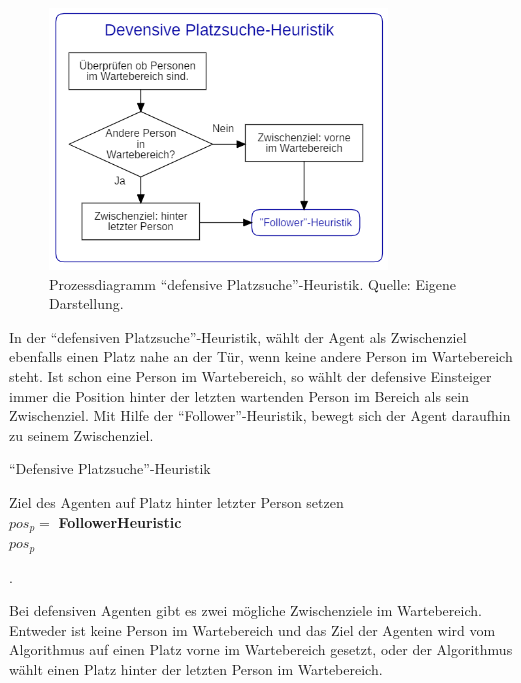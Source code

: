 \begin{figure}[H]
	\centering
		\includegraphics[width=0.8\textwidth]{pictures/model/algorithm/boarding/defensive_boarding/defensive_space_find_heuristic.png}
	\caption{Prozessdiagramm "`defensive Platzsuche"'-Heuristik. Quelle: Eigene Darstellung.}
	\label{fig:DPH}
\end{figure}
In der "`defensiven Platzsuche"'-Heuristik, wählt der Agent als Zwischenziel ebenfalls einen Platz nahe an der Tür, wenn keine andere Person im Wartebereich steht. Ist schon eine Person im Wartebereich, so wählt der defensive Einsteiger immer die Position hinter der letzten wartenden Person im Bereich als sein Zwischenziel. Mit Hilfe der "`Follower"'-Heuristik, bewegt sich der Agent daraufhin zu seinem Zwischenziel. \\
\begin{algorithm} [H]
	\caption{"`Defensive Platzsuche"'-Heuristik}
	
	\DefensiveSpaceFindHeuristic{} {
		 {
			Ziel des Agenten auf Platz hinter letzter Person setzen\\
		} 
		$pos_p = $ \textbf{FollowerHeuristic} \\
		\Return $pos_p$
	}
\end{algorithm}.

Bei defensiven Agenten gibt es zwei mögliche Zwischenziele im Wartebereich. Entweder ist keine Person im Wartebereich und das Ziel der Agenten wird vom Algorithmus auf einen Platz vorne im Wartebereich gesetzt, oder der Algorithmus wählt einen Platz hinter der letzten Person im Wartebereich.

